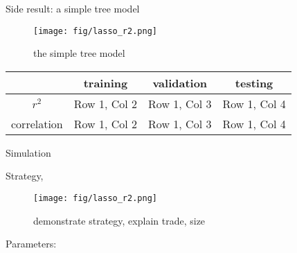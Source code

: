 \documentclass[10pt]{beamer}
\begin{document}
\begin{frame}{Side result: a simple tree model}




\begin{figure}
    \centering
    \texttt{[image: fig/lasso\_r2.png]}
    \caption{the simple tree model}
\end{figure}

\begin{table}[h!]
\centering
\begin{tabular}{c|c|c|c}
\hline
 & \textbf{training} & \textbf{validation} & \textbf{testing} \\ \hline
$r^2$      & Row 1, Col 2      & Row 1, Col 3      & Row 1, Col 4      \\ \hline
correlation      & Row 1, Col 2      & Row 1, Col 3      & Row 1, Col 4      \\ \hline
\end{tabular}
\end{table}

\end{frame}


\begin{frame}{Simulation}

Strategy,


\begin{figure}
    \centering
    \texttt{[image: fig/lasso\_r2.png]}
    \caption{demonstrate strategy, explain trade, size}
\end{figure}

Parameters: 


\end{frame}
\end{document}
